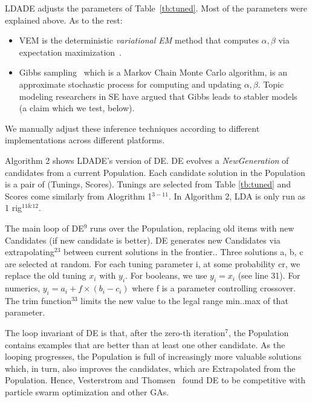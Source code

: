 \documentclass[10pt,conference]{IEEEtran}
\newcommand{\bi}{\begin{itemize}}
\newcommand{\ei}{\end{itemize}}
\theoremstyle{break}
\begin{document}
LDADE  adjusts the parameters of
Table~\ref{tb:tuned}. Most of the parameters were explained above. As to the rest:
\bi
\item VEM is the deterministic {\em variational EM} method that computes $\alpha,\beta$ via
  expectation maximization~\cite{minka2002expectation}.
\item Gibbs sampling~\cite{wei2006lda, griffiths2004finding} which is a Markov Chain Monte Carlo algorithm, is an approximate stochastic process for computing and updating $\alpha,\beta$.
  Topic modeling researchers in SE have argued that Gibbs leads to stabler models~\cite{layman16a,layman2016topic} (a claim which we test, below).
  \ei

We manually adjust these inference techniques according to different implementations across different platforms.



Algorithm 2 shows LDADE's version of DE.  DE evolves a \textit{NewGeneration} of
candidates from a current Population.   Each candidate solution in the Population is a pair of
(Tunings, Scores). Tunings are selected from Table \ref{tb:tuned} and Scores
come similarly from Alogrithm 1$^{3-11}$. In Algorithm 2, LDA is only run as 1 rig$^{11 \& 12}$.



The main loop of DE$^{9}$ runs over the Population, replacing old items with new Candidates (if new candidate is better).
DE generates new Candidates via 
extrapolating$^{23}$ between current solutions in the frontier.. Three solutions a, b, c are
selected at random. For each tuning parameter i, at some probability cr, we
replace the old tuning $x_i$ with $y_i$. For booleans, we use $y_i = x_i$ (see
line 31). For numerics, $y_i = a_i + f \times (b_i - c_i)$ where f is a
parameter controlling crossover. The trim function$^{33}$ limits the new value
to the legal range min..max of that parameter.

The loop invariant of DE is that, after the zero-th iteration$^7$, the Population
contains examples that are better than at least one other candidate.
As the looping progresses, the Population is full of increasingly more valuable solutions
which, in turn, also improves the candidates, which are Extrapolated from the Population.
Hence, Vesterstrom and Thomsen~\cite{vesterstrom2004comparative} found DE to be
competitive with particle swarm optimization and other GAs.
\end{document}

